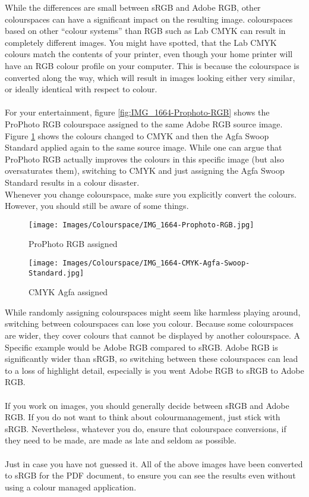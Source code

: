 While the differences are small between sRGB and Adobe RGB, other \glspl{colourspace} can have a significant impact on the resulting image. \Glspl{colourspace} based on other ``colour systems'' than RGB such as Lab CMYK can result in completely different images. You might have spotted, that the Lab CMYK colours match the contents of your printer, even though your home printer will have an RGB colour profile on your computer. This is because the \gls{colourspace} is converted along the way, which will result in images looking either very similar, or ideally identical with respect to colour.
\\
\\
For your entertainment, figure \ref{fig:IMG_1664-Prophoto-RGB} shows the ProPhoto RGB \gls{colourspace} assigned to the same Adobe RGB source image. Figure \ref{fig:IMG_1664-CMYK-Agfa-Swoop-Standard} shows the colours changed to CMYK and then the Agfa Swoop Standard applied again to the same source image. While one can argue that ProPhoto RGB actually improves the colours in this specific image (but also oversaturates them), switching to CMYK and just assigning the Agfa Swoop Standard results in a colour disaster.
\\
Whenever you change \gls{colourspace}, make sure you explicitly convert the colours. However, you should still be aware of some things.

\begin{figure}[htb]
\begin{minipage}{.5\textwidth}
	\centering
		\texttt{[image: Images/Colourspace/IMG\_1664-Prophoto-RGB.jpg]}
	\caption{ProPhoto RGB assigned}
	\label{fig:IMG_1664-Prophoto-RGB}
\end{minipage}
\begin{minipage}{.5\textwidth}
	\centering
		\texttt{[image: Images/Colourspace/IMG\_1664-CMYK-Agfa-Swoop-Standard.jpg]}
	\caption{CMYK Agfa assigned}
	\label{fig:IMG_1664-CMYK-Agfa-Swoop-Standard}
	\end{minipage}
\end{figure}

While randomly assigning \glspl{colourspace} might seem like harmless playing around, switching between \glspl{colourspace} can lose you colour. Because some \glspl{colourspace} are wider, they cover colours that cannot be displayed by another \gls{colourspace}. A Specific example would be Adobe RGB compared to sRGB. Adobe RGB is significantly wider than sRGB, so switching between these \glspl{colourspace} can lead to a loss of highlight detail, especially is you went Adobe RGB to sRGB to Adobe RGB.
\\
\\
If you work on images, you should generally decide between sRGB and Adobe RGB. If you do not want to think about \gls{colourmanagement}, just stick with sRGB. Nevertheless, whatever you do, ensure that \gls{colourspace} conversions, if they need to be made, are made as late and seldom as possible.
\\
\\
Just in case you have not guessed it. All of the above images have been converted to sRGB for the PDF document, to ensure you can see the results even without using a colour managed application.

